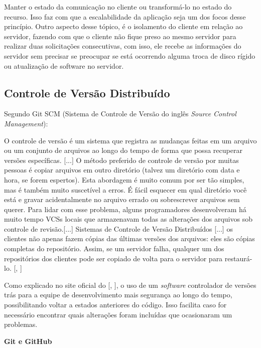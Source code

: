 \documentclass[
	12pt,				%
	oneside,			%
	a4paper,			%
	brazil				%
]{abntex2}
\newcommand{\citecustom}[1]{[\citeauthoronline{#1}, \citeyear{#1}]}
\begin{document}
{\begin{description}
Manter o estado da comunicação no cliente ou transformá-lo no estado do recurso. Isso faz com que a escalabilidade da aplicação seja um dos focos desse princípio. Outro aspecto desse tópico, é o isolamento do cliente em relação ao servidor, fazendo com que o cliente não fique preso ao mesmo servidor para realizar duas solicitações consecutivas, com isso, ele recebe as informações do servidor sem precisar se preocupar se está ocorrendo alguma troca de disco rígido ou atualização de software no servidor.

\end{description} 


\subsection{Controle de Versão Distribuído}

Segundo Git SCM (Sistema de Controle de Versão do inglês \textit{Source Control Management}):

\begin{citacao}
O controle de versão é um sistema que registra as mudanças feitas em um arquivo ou um conjunto de arquivos ao longo do tempo de forma que possa recuperar versões específicas. [...]
O método preferido de controle de versão por muitas pessoas é copiar arquivos em outro diretório (talvez um diretório com data e hora, se forem espertos). Esta abordagem é muito comum por ser tão simples, mas é também muito suscetível a erros. É fácil esquecer em qual diretório você está e gravar acidentalmente no arquivo errado ou sobrescrever arquivos sem querer. Para lidar com esse problema, alguns programadores desenvolveram há muito tempo VCSs locais que armazenavam todas as alterações dos arquivos sob controle de revisão.[...]
Sistemas de Controle de Versão Distribuídos [...] os clientes não apenas fazem cópias das últimas versões dos arquivos: eles são cópias completas do repositório. Assim, se um servidor falha, qualquer um dos repositórios dos clientes pode ser copiado de volta para o servidor para restaurá-lo. \citecustom{Git2016}
\end{citacao}

Como explicado no site oficial do \citecustom{Git2016}, o uso de um \textit{software} controlador de versões trás para a equipe de desenvolvimento mais segurança ao longo do tempo, possibilitando voltar a estados anteriores do código. Isso facilita caso for necessário encontrar quais alterações foram incluídas que ocasionaram um problemas.

\textbf{Git e GitHub}

}
\end{document}
